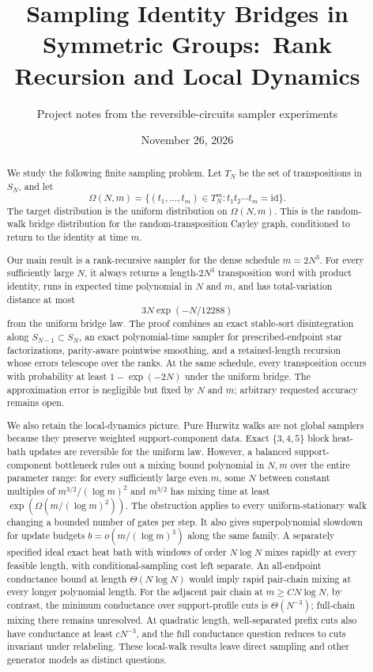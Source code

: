 \documentclass[11pt]{article}
\title{Sampling Identity Bridges in Symmetric Groups:\ Rank Recursion and Local Dynamics}
\author{Project notes from the reversible-circuits sampler experiments}
\date{November 26, 2026}
\newcommand{\id}{\mathrm{id}}
\begin{document}
\maketitle

\begin{abstract}
We study the following finite sampling problem.  Let $T_N$ be the set of
transpositions in $S_N$, and let
\[
  \Omega(N,m)
  =
  \{(t_1,\ldots,t_m)\in T_N^m : t_1t_2\cdots t_m=\id\}.
\]
The target distribution is the uniform distribution on $\Omega(N,m)$.
This is the random-walk bridge distribution for the random-transposition
Cayley graph, conditioned to return to the identity at time $m$.

Our main result is a rank-recursive sampler for the dense schedule $m=2N^3$.
For every sufficiently large $N$, it always returns a length-$2N^3$
transposition word with product identity, runs in expected time polynomial in
$N$ and $m$, and has total-variation distance at most
\[
  3N\exp(-N/12288)
\]
from the uniform bridge law.  The proof combines an exact stable-sort
disintegration along $S_{N-1}\subset S_N$, an exact polynomial-time sampler
for prescribed-endpoint star factorizations, parity-aware pointwise smoothing,
and a retained-length recursion whose errors telescope over the ranks.  At the
same schedule, every transposition occurs with probability at least
$1-\exp(-2N)$ under the uniform bridge.  The approximation error is negligible
but fixed by $N$ and $m$; arbitrary requested accuracy remains open.

We also retain the local-dynamics picture.  Pure Hurwitz walks are not global
samplers because they preserve weighted support-component data.  Exact
$\{3,4,5\}$ block heat-bath updates are reversible for the uniform law.
However, a balanced support-component bottleneck rules out a mixing bound
polynomial in $N,m$ over the entire parameter range: for every sufficiently
large even $m$, some $N$ between constant multiples of
$m^{3/2}/(\log m)^2$ and $m^{3/2}$ has mixing time at least
$\exp(\Omega(m/(\log m)^2))$.  The obstruction applies to every
uniform-stationary walk changing a bounded number of gates per step.
It also gives superpolynomial slowdown for update budgets
$b=o(m/(\log m)^3)$ along the same family.  A separately specified
ideal exact heat bath with windows of order $N\log N$ mixes rapidly
at every feasible length, with conditional-sampling cost left separate.
An all-endpoint conductance bound at length $\Theta(N\log N)$ would
imply rapid pair-chain mixing at every longer polynomial length.
For the adjacent pair chain at $m\ge CN\log N$, by contrast, the minimum
conductance over support-profile cuts is $\Theta(N^{-3})$; full-chain
mixing there remains unresolved.  At quadratic length, well-separated
prefix cuts also have conductance at least $cN^{-3}$, and the full
conductance question reduces to cuts invariant under relabeling.
These local-walk results leave direct
sampling and other generator models as distinct questions.
\end{abstract}
\end{document}
